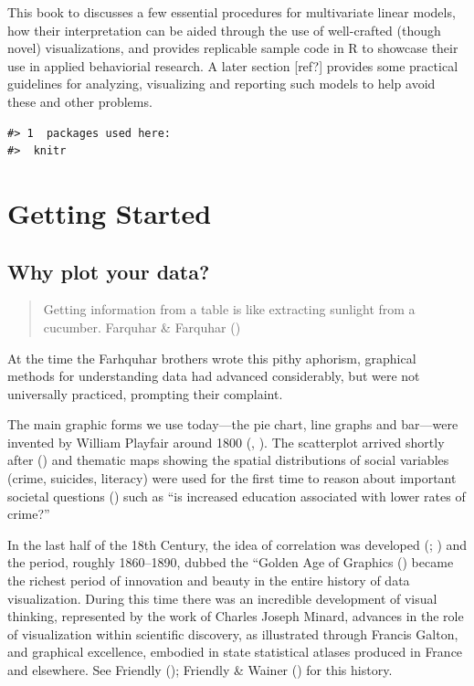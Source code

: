 \documentclass[
  letterpaper,
  10pt,
  krantz2]{krantz}
\newcommand{\ix}[1]{\index{#1}}
\begin{document}
This book to discusses a few essential procedures for multivariate
linear models, how their interpretation can be aided through the use of
well-crafted (though novel) visualizations, and provides replicable
sample code in R to showcase their use in applied behaviorial research.
A later section {[}ref?{]} provides some practical guidelines for
analyzing, visualizing and reporting such models to help avoid these and
other problems.

\begin{verbatim}
#> 1  packages used here:
#>  knitr
\end{verbatim}


\chapter{Getting Started}\label{sec-getting_started}

\section{Why plot your data?}\label{sec-why_plot}

\begin{quote}
Getting information from a table is like extracting sunlight from a
cucumber. Farquhar \& Farquhar
()
\end{quote}

At the time the Farhquhar brothers wrote this pithy aphorism, graphical
methods for understanding data had advanced considerably, but were not
universally practiced, prompting their complaint.

The main graphic forms we use today---the pie chart, line graphs and
bar---were invented by William Playfair around 1800
(,
). The scatterplot arrived shortly
after () and thematic maps
showing the spatial distributions of social variables (crime, suicides,
literacy) were used for the first time to reason about important
societal questions () such as
``is increased education associated with lower rates of crime?''
\ix{pie chart} \ix{bar chart} \ix{line graph} \ix{scatterplot}

In the last half of the 18th Century, the idea of correlation was
developed (;
) and the period, roughly
1860--1890, dubbed the ``Golden Age of Graphics
() became the richest
period of innovation and beauty in the entire history of data
visualization. During this time there was an incredible development of
visual thinking, represented by the work of Charles Joseph Minard,
advances in the role of visualization within scientific discovery, as
illustrated through Francis Galton, and graphical excellence, embodied
in state statistical atlases produced in France and elsewhere. See
Friendly (); Friendly \& Wainer
() for this history.
\end{document}
